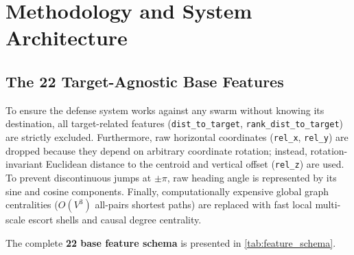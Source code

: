 \documentclass[9pt]{ieeeconf}
\begin{document}
\section{Methodology and System Architecture}
\label{sec:methodology}

\subsection{The 22 Target-Agnostic Base Features}
To ensure the defense system works against any swarm without knowing its destination, all target-related features (\texttt{dist\_to\_target}, \texttt{rank\_dist\_to\_target}) are strictly excluded. Furthermore, raw horizontal coordinates (\texttt{rel\_x}, \texttt{rel\_y}) are dropped because they depend on arbitrary coordinate rotation; instead, rotation-invariant Euclidean distance to the centroid and vertical offset (\texttt{rel\_z}) are used. To prevent discontinuous jumps at $\pm\pi$, raw heading angle is represented by its sine and cosine components. Finally, computationally expensive global graph centralities ($O(V^3)$ all-pairs shortest paths) are replaced with fast local multi-scale escort shells and causal degree centrality.

The complete \textbf{22 base feature schema} is presented in \cref{tab:feature_schema}.
\end{document}
